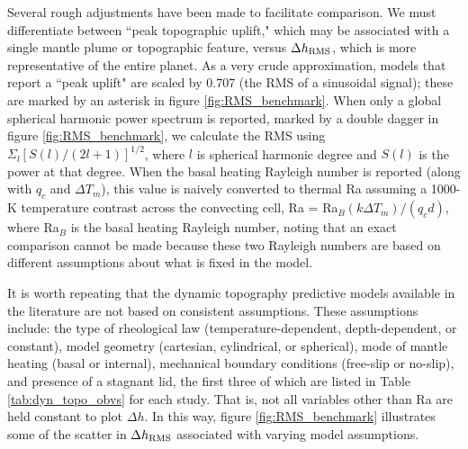 Several rough adjustments have been made to facilitate comparison. We must differentiate between ``peak topographic uplift," which may be associated with a single mantle plume or topographic feature, versus $\Delta h_{\rm RMS}$, which is more representative of the entire planet. As a very crude approximation, models that report a ``peak uplift" are scaled by 0.707 (the RMS of a sinusoidal signal); these are marked by an asterisk in figure \ref{fig:RMS_benchmark}. When only a global spherical harmonic power spectrum is reported, marked by a double dagger in figure \ref{fig:RMS_benchmark}, we calculate the RMS using $\Sigma_l [S(l)/(2l + 1)]^{1/2}$, where $l$ is spherical harmonic degree and $S(l)$ is the power at that degree. When the basal heating Rayleigh number is reported (along with $q_c$ and $\Delta T_m$), this value is naively converted to thermal Ra assuming a 1000-K temperature contrast across the convecting cell, Ra = Ra$_B (k \Delta T_m)/(q_c d)$, where Ra$_B$ is the basal heating Rayleigh number, noting that an exact comparison cannot be made because these two Rayleigh numbers are based on different assumptions about what is fixed in the model.

It is worth repeating that the dynamic topography predictive models available in the literature are not based on consistent assumptions. These assumptions include: the type of rheological law (temperature-dependent, depth-dependent, or constant), model geometry (cartesian, cylindrical, or spherical), mode of mantle heating (basal or internal), mechanical boundary conditions (free-slip or no-slip), and presence of a stagnant lid, the first three of which are listed in Table \ref{tab:dyn_topo_obvs} for each study. That is, not all variables other than Ra are held constant to plot $\Delta h$. In this way, figure \ref{fig:RMS_benchmark} illustrates some of the scatter in $\Delta h_{\rm RMS}$ associated with varying model assumptions.

